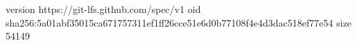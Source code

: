 version https://git-lfs.github.com/spec/v1
oid sha256:5a01abf35015ca671757311ef1ff26cce51e6d0b77108f4e4d3dac518ef77e54
size 54149
